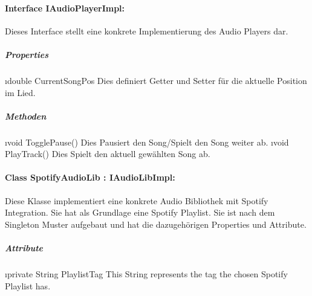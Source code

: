 \documentclass[../entwurf.tex]{subfiles}
\begin{document}
			\paragraph{Interface IAudioPlayerImpl:}
				Dieses Interface stellt eine konkrete Implementierung des Audio Players dar.
				\subparagraph{Properties}
					\begin{itemize}
						\i{double CurrentSongPos} Dies definiert Getter und Setter für die aktuelle Position im Lied.
					\end{itemize}
				\subparagraph{Methoden}
					\begin{itemize}
						\i{void TogglePause()} Dies Pausiert den Song/Spielt den Song weiter ab.
						\i{void PlayTrack()} Dies Spielt den aktuell gewählten Song ab.
					\end{itemize}
			\paragraph{Class SpotifyAudioLib : IAudioLibImpl:}
				Diese Klasse implementiert eine konkrete Audio Bibliothek mit Spotify Integration.
				Sie hat als Grundlage eine Spotify Playlist.
				Sie ist nach dem Singleton Muster aufgebaut und hat die dazugehörigen Properties und Attribute.
				\subparagraph{Attribute}
					\begin{itemize}
						\i{private String PlaylistTag} This String represents the tag the chosen Spotify Playlist has.
					\end{itemize}
			
					
\end{document}
